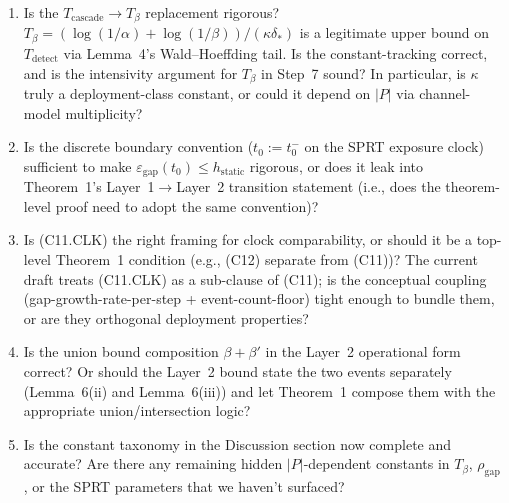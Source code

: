 \documentclass{article}
\newcommand{\deltastar}{\delta_{*}}
\newcommand{\rhogap}{\rho_{\mathrm{gap}}}
\newcommand{\epsgap}{\varepsilon_{\mathrm{gap}}}
\newcommand{\Tbeta}{T_{\beta}}
\begin{document}
\begin{enumerate}
\item Is the $T_{\mathrm{cascade}} \to \Tbeta$ replacement
  rigorous?  $\Tbeta = (\log(1/\alpha) + \log(1/\beta)) /
  (\kappa \deltastar)$ is a legitimate upper bound on
  $T_{\mathrm{detect}}$ via Lemma~4's Wald--Hoeffding tail.  Is
  the constant-tracking correct, and is the intensivity argument
  for $\Tbeta$ in Step~7 sound?  In particular, is $\kappa$ truly a
  deployment-class constant, or could it depend on $|P|$ via
  channel-model multiplicity?

\item Is the discrete boundary convention ($t_0 := t_0^-$ on the
  SPRT exposure clock) sufficient to make $\epsgap(t_0) \leq
  h_{\mathrm{static}}$ rigorous, or does it leak into Theorem~1's
  Layer~1$\to$Layer~2 transition statement (i.e., does the
  theorem-level proof need to adopt the same convention)?

\item Is (C11.CLK) the right framing for clock comparability, or
  should it be a top-level Theorem~1 condition (e.g., (C12)
  separate from (C11))?  The current draft treats (C11.CLK) as a
  sub-clause of (C11); is the conceptual coupling
  (gap-growth-rate-per-step + event-count-floor) tight enough to
  bundle them, or are they orthogonal deployment properties?

\item Is the union bound composition $\beta + \beta'$ in the
  Layer~2 operational form correct?  Or should the Layer~2 bound
  state the two events separately
  (Lemma~6(ii) and Lemma~6(iii)) and let Theorem~1 compose them
  with the appropriate union/intersection logic?

\item Is the constant taxonomy in the Discussion section now
  complete and accurate?  Are there any remaining hidden
  $|P|$-dependent constants in $\Tbeta$, $\rhogap$, or the SPRT
  parameters that we haven't surfaced?
\end{enumerate}
\end{document}
